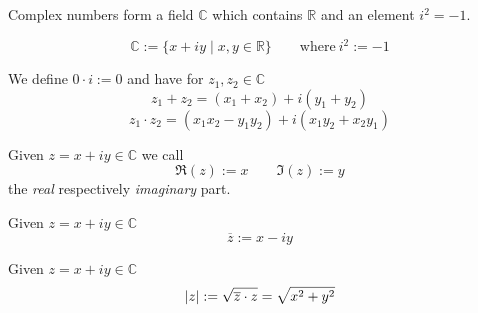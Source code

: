 Complex numbers form a field \(\mathbb{C}\) which contains \(\mathbb{R}\) and an element \(i^2 = -1\).

\begin{definition}
   \[\mathbb{C} := \{x + iy \mid x, y \in \mathbb{R}\} \qquad\text{where}~i^2 := -1\]
\end{definition}
\begin{remark}
   We define \(0 \cdot i := 0\) and have for \(z_1, z_2 \in \mathbb{C}\)
   \[z_1 + z_2 =  (x_1 + x_2) + i(y_1 + y_2)\]
   \[z_1 \cdot z_2 = (x_1x_2 - y_1y_2) + i(x_1y_2 + x_2y_1)\]
\end{remark}

\begin{definition}
   Given \(z = x + iy \in \mathbb{C}\) we call
   \[\Re(z) := x \qquad \Im(z) := y\]
   the \emph{real} respectively \emph{imaginary} part.
\end{definition}

\begin{definition}
   Given \(z = x + iy \in \mathbb{C}\)
   \[\overline{z} := x - iy\]
\end{definition}

\begin{definition}
   Given \(z = x + iy \in \mathbb{C}\)
   \[\left\lvert z\right\rvert := \sqrt{\overline{z} \cdot z} = \sqrt{x^2 + y^2}\]
\end{definition}

